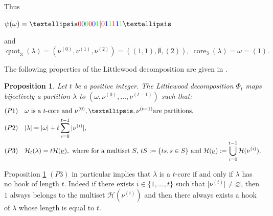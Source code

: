 \documentclass[11pt,letterpaper]{amsart}
\def\cch{\mathcal H}
\DeclareMathOperator{\BGP}{BG}
\DeclareMathOperator{\WLP}{WL}
\DeclareMathOperator{\core}{core}
\DeclareMathOperator{\quot}{quot}
\newtheorem{prop}[df]{Proposition}		%
\numberwithin{equation}{section}
\numberwithin{df}{section}
\begin{document}
Thus
\begin{center}
$\psi(\omega)=\ldots \color{red}{0} \color{blue}{0} \color{green}{0} \color{red}{0} \color{blue}{0}\color{green}{1} \color{black}| \color{red}{0} \color{blue}{1} \color{green}{1} \color{red}{1} \color{blue}{1} \color{green}{1}\color{black}\ldots $
\end{center}
and
$$
\quot_3(\lambda)=\left(\nu^{(0)},\nu^{(1)},\nu^{(2)}\right)=\left((1,1),\emptyset,(2)\right),\ \core_3(\lambda)= \omega=(1).%
$$

The following properties of the Littlewood decomposition are given in \cite{HJ}.

\begin{prop}\cite[Theorem 2.1]{HJ}
\label{Littlewood} Let $t$ be a positive integer. The Littlewood decomposition $\Phi_t$ maps bijectively a partition $\lambda$ to $\left(\omega,\nu^{(0)},\dots,\nu^{(t-1)}\right)$ such that:
\begin{align*}
&(P1)\quad \omega \text{ is a $t$-core and }\nu^{(0)},\dots,\nu^{(t-1)} \text{are partitions},\\
&(P2) \quad |\lambda|=|\omega|+t\sum_{i=0}^{t-1} |\nu^{(i)}|,\\
&(P3)\quad \mathcal{H}_t(\lambda)=t\mathcal{H}(\underline{\nu}),
\text{ where for a multiset $S$, } tS:=\{ts,s\in S\}\text{ and } \mathcal{H}(\underline{\nu}):=\bigcup\limits_{i=0}^{t	-1}\cch(\nu^{(i)}).\notag
\end{align*}
\end{prop}

%
\begin{rm}
Proposition \ref{Littlewood} $(P3)$ in particular implies that $\lambda$ is a $t$-core if and only if $\lambda$ has no hook of length $t$. Indeed if there exists $i\in\lbrace 1,\dots,t\rbrace$ such that $\lvert \nu^{(i)}\rvert\neq \varnothing$, then $1$ always belongs to the multiset $\cch(\nu^{(i)})$ and then there always exists a hook of $\lambda$ whose length is equal to $t$.
\end{rm}
\end{document}
